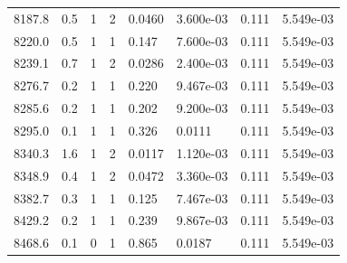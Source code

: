 \documentclass[preview]{standalone}
\begin{document}
{{{{{{{{{{{\begin{tabular}{L{1.2cm}C{1.2cm} C{0.3cm}C{0.5cm} C{1.4cm}C{1.4cm} C{1.4cm}C{1.4cm}}
  8187.8  &   0.5  & 1     &  2 &  0.0460  & 3.600e-03  & 0.111 &  5.549e-03   \\ 
  8220.0  &   0.5  & 1     &  1 &  0.147  & 7.600e-03  & 0.111 &  5.549e-03   \\ 
  8239.1  &   0.7  & 1     &  2 &  0.0286  & 2.400e-03  & 0.111 &  5.549e-03   \\ 
  8276.7  &   0.2  & 1     &  1 &  0.220  & 9.467e-03  & 0.111 &  5.549e-03   \\ 
  8285.6  &   0.2  & 1     &  1 &  0.202  & 9.200e-03  & 0.111 &  5.549e-03   \\ 
  8295.0  &   0.1  & 1     &  1 &  0.326  & 0.0111  & 0.111 &  5.549e-03   \\ 
  8340.3  &   1.6  & 1     &  2 &  0.0117  & 1.120e-03  & 0.111 &  5.549e-03   \\ 
  8348.9  &   0.4  & 1     &  2 &  0.0472  & 3.360e-03  & 0.111 &  5.549e-03   \\ 
  8382.7  &   0.3  & 1     &  1 &  0.125  & 7.467e-03  & 0.111 &  5.549e-03   \\ 
  8429.2  &   0.2  & 1     &  1 &  0.239  & 9.867e-03  & 0.111 &  5.549e-03   \\ 
  8468.6  &   0.1  & 0     &  1 &  0.865  & 0.0187  & 0.111 &  5.549e-03   \\ 
\hline 
\end{tabular} 

}}}}}}}}}}}
\end{document}

